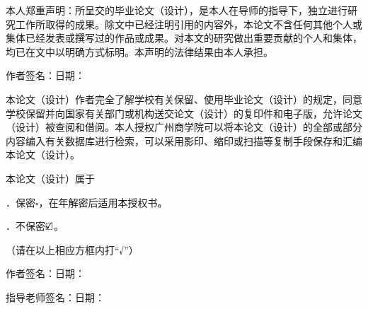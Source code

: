 \thispagestyle{empty}
\begingroup
\gccFangSong{}


本人郑重声明：所呈交的毕业论文（设计），是本人在导师的指导下，独立进行研究工作所取得的成果。除文中已经注明引用的内容外，本论文不含任何其他个人或集体已经发表或撰写过的作品或成果。对本文的研究做出重要贡献的个人和集体，均已在文中以明确方式标明。本声明的法律结果由本人承担。

\vspace{1.0cm}
\noindent 作者签名：\hspace{4.5cm}日期：\gccStatementDate

\vspace{1.3cm}

本论文（设计）作者完全了解学校有关保留、使用毕业论文（设计）的规定，同意学校保留并向国家有关部门或机构送交论文（设计）的复印件和电子版，允许论文（设计）被查阅和借阅。本人授权广州商学院可以将本论文（设计）的全部或部分内容编入有关数据库进行检索，可以采用影印、缩印或扫描等复制手段保存和汇编本论文（设计）。

\vspace{0.7cm}
\noindent 本论文（设计）属于

\vspace{0.3cm}
．保密$\square$，在\underline{\makebox[2.8cm][c]{}}年解密后适用本授权书。

\vspace{0.25cm}
．不保密$\rlap{\raisebox{0.2ex}{\checkmark}}\square$。

\vspace{0.35cm}
\noindent （请在以上相应方框内打“√”）

\vspace{0.9cm}
\noindent 作者签名：\hspace{4.5cm}日期：\gccStatementDate

\vspace{0.6cm}
\noindent 指导老师签名：\hspace{3.7cm}日期：\gccStatementDate

\endgroup

